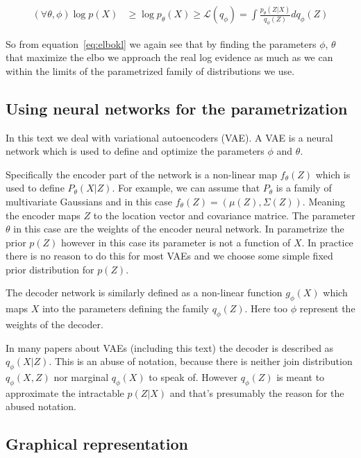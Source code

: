 \documentclass[11pt, a4paper]{report}
\theoremstyle{plain}
\theoremstyle{definition}
\theoremstyle{remark}
\begin{document}
\begin{equation}\label{eq:parelbo}
\begin{aligned}
(\forall \theta, \phi)\log p(X) & \geq \log p_{\theta}(X) \geq \mathcal{L}(q_{\phi})
= \int \frac{p_{\theta}(Z|X)}{q_{\phi}(Z)} dq_{\phi}(Z)
\end{aligned}
\end{equation}

So from equation~\ref{eq:elbokl} we again see that by finding the parameters
$\phi$, $\theta$ that maximize the elbo we approach the real log evidence as much
as we can within the limits of the parametrized family of distributions we use.

\subsection{Using neural networks for the parametrization}
In this text we deal with variational autoencoders (VAE).
A VAE is a neural network which is used to define and optimize the parameters
$\phi$ and $\theta$.

Specifically the encoder part of the network is a non-linear map $f_{\theta}(Z)$ which is
used to define $P_{\theta}(X|Z)$. For example, we can assume that $P_{\theta}$
is a family of multivariate Gaussians and in this case $f_{\theta}(Z) =
(\mu(Z), \Sigma(Z))$. Meaning the encoder maps $Z$ to the location vector and
covariance matrice. The parameter $\theta$ in this case are the weights of the
encoder neural network. In parametrize the prior $p(Z)$ however in this case its
parameter is not a function of $X$. In practice there is no reason to do this
for most VAEs and we choose some simple fixed prior distribution for $p(Z)$.

The decoder network is similarly defined as a non-linear function $g_{\phi}(X)$ which
maps $X$ into the parameters defining the family $q_{\phi}(Z)$. Here too $\phi$
represent the weights of the decoder.

\remark{}\label{rem:abuse_of_notation}
In many papers about VAEs (including this text) the decoder is described as
$q_{\phi}(X | Z)$. This is an abuse of notation, because there is neither 
join distribution $q_{\phi}(X,Z)$ nor marginal $q_{\phi}(X)$ to speak of.
However $q_{\phi}(Z)$ is meant to approximate the intractable $p(Z|X)$ and
that's presumably the reason for the abused notation.


\subsection{Graphical representation}
\end{document}
